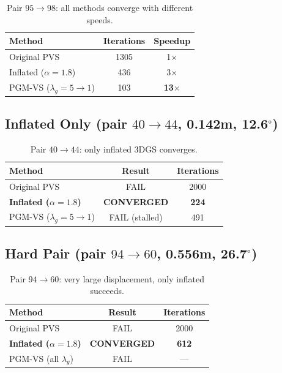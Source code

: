 \documentclass[11pt]{article}
\begin{document}
\begin{table}[h!]
\centering
\caption{Pair $95 \to 98$: all methods converge with different speeds.}
\begin{tabular}{lcc}
\toprule
\textbf{Method} & \textbf{Iterations} & \textbf{Speedup} \\
\midrule
Original PVS & 1305 & 1$\times$ \\
Inflated ($\alpha=1.8$) & 436 & 3$\times$ \\
PGM-VS ($\lambda_g = 5 \to 1$) & 103 & \textbf{13$\times$} \\
\bottomrule
\end{tabular}
\end{table}

\subsection{Inflated Only (pair $40 \to 44$, 0.142m, 12.6$^\circ$)}

\begin{table}[h!]
\centering
\caption{Pair $40 \to 44$: only inflated 3DGS converges.}
\begin{tabular}{lcc}
\toprule
\textbf{Method} & \textbf{Result} & \textbf{Iterations} \\
\midrule
Original PVS & FAIL & 2000 \\
\textbf{Inflated ($\alpha=1.8$)} & \textbf{CONVERGED} & \textbf{224} \\
PGM-VS ($\lambda_g = 5 \to 1$) & FAIL (stalled) & 491 \\
\bottomrule
\end{tabular}
\end{table}

\subsection{Hard Pair (pair $94 \to 60$, 0.556m, 26.7$^\circ$)}

\begin{table}[h!]
\centering
\caption{Pair $94 \to 60$: very large displacement, only inflated succeeds.}
\begin{tabular}{lcc}
\toprule
\textbf{Method} & \textbf{Result} & \textbf{Iterations} \\
\midrule
Original PVS & FAIL & 2000 \\
\textbf{Inflated ($\alpha=1.8$)} & \textbf{CONVERGED} & \textbf{612} \\
PGM-VS (all $\lambda_g$) & FAIL & --- \\
\bottomrule
\end{tabular}
\end{table}
\end{document}
